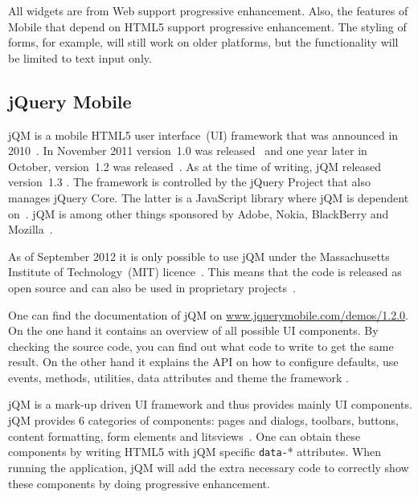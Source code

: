 \documentclass[a4paper]{artikel3}
\newcommand{\code}[1]{\texttt{#1}}
\newcommand{\exturl}[1]{\href{http://#1}{#1}}
\newcommand{\setspace}[0]{\vspace{2mm}}
\renewcommand{\paragraph}[1]{\setspace \noindent {\bf #1}  }
\begin{document}
All widgets are from \kendo{} Web support progressive enhancement.
Also,  the features of \kendo{} Mobile that depend on HTML5 support progressive enhancement.
The styling of forms,  for example,  will still work on older platforms, but the functionality will be limited to text input only.



\subsection{jQuery Mobile} %
\label{sec:jqm}

jQM is a mobile HTML5 user interface~(UI) framework that was announced in 2010~\cite{Resig2010}. 
In November 2011 version~1.0 was released~\cite{Parker2011} and one year later in October, version~1.2 was released~\cite{Parker2012}. 
As at the time of writing, jQM released version~1.3 \cite{Parker2013a}.
The framework is controlled by the jQuery Project that also manages jQuery Core. 
The latter is a JavaScript library where jQM is dependent on~\cite{JQuery2012}. 
jQM is among other things sponsored by Adobe, Nokia, BlackBerry and Mozilla~\cite{JQuery2012a}.

\paragraph{Licence}
As of September 2012 it is only possible to use jQM under the Massachusetts Institute of Technology~(MIT) licence~\cite{Dmethvin2012}. 
This means that the code is released as open source and can also be used in proprietary projects~\cite{PhilDutson2012}.

\paragraph{Documentation}
One can find the documentation of jQM on \exturl{www.jquerymobile.com/demos/1.2.0}. On the one hand it contains an overview of all possible UI components. 
By checking the source code, you can find out what code to write to get the same result. 
On the other hand it explains the API on how to configure defaults, use events, methods, utilities, data attributes and theme the framework \cite{JQuery2012b}.

\paragraph{Code and development}
jQM is a mark-up driven UI framework and thus provides mainly UI components. 
jQM provides 6 categories of components: pages and dialogs, toolbars, buttons, content formatting, form elements and litsviews~\cite{JQuery2012b}. 
One can obtain these components by writing HTML5 with jQM specific \code{data-}* attributes. 
When running the application, jQM will add the extra necessary code to correctly show these components by doing progressive enhancement.
\end{document}

